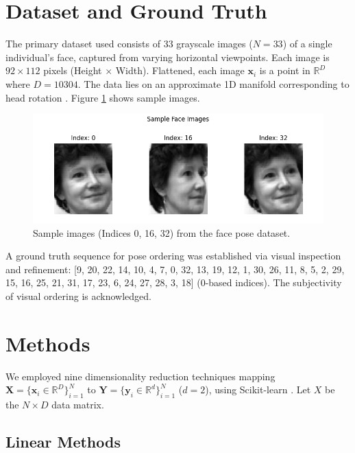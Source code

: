 \documentclass{article}
\begin{document}
\section{Dataset and Ground Truth}
\label{sec:dataset}

The primary dataset used consists of 33 grayscale images ($N=33$) of a single individual's face, captured from varying horizontal viewpoints. Each image is $92 \times 112$ pixels (Height $\times$ Width). Flattened, each image $\mathbf{x}_i$ is a point in $\mathbb{R}^{D}$ where $D=10304$. The data lies on an approximate 1D manifold corresponding to head rotation \citep{Tenenbaum2000}. Figure \ref{fig:sample_faces} shows sample images.

\begin{figure}[htbp]
  \centering
  \includegraphics[width=0.8\linewidth]{../figs/sample_faces.png} %
  \caption{Sample images (Indices 0, 16, 32) from the face pose dataset.}
  \label{fig:sample_faces}
\end{figure}

A ground truth sequence for pose ordering was established via visual inspection and refinement: [9, 20, 22, 14, 10, 4, 7, 0, 32, 13, 19, 12, 1, 30, 26, 11, 8, 5, 2, 29, 15, 16, 25, 21, 31, 17, 23, 6, 24, 27, 28, 3, 18] (0-based indices). The subjectivity of visual ordering is acknowledged.

\section{Methods}\label{sec:methods}

We employed nine dimensionality reduction techniques mapping $\mathbf{X} = \{\mathbf{x}_i \in \mathbb{R}^D\}_{i=1}^N$ to $\mathbf{Y} = \{\mathbf{y}_i \in \mathbb{R}^d\}_{i=1}^N$ ($d=2$), using Scikit-learn \citep{scikit-learn}. Let $X$ be the $N \times D$ data matrix.

\subsection{Linear Methods}
\end{document}
